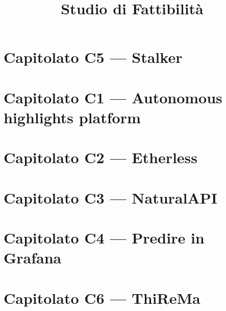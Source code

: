\documentclass{article}
\title{Studio di Fattibilità}
\begin{document}


\section{Capitolato C5 --- Stalker}%
\label{sec:c5}



\newpage
\section{Capitolato C1 --- Autonomous highlights platform}%
\label{sec:c1}



\newpage
\section{Capitolato C2 --- Etherless}%
\label{sec:c2}



\newpage
\section{Capitolato C3 --- NaturalAPI}%
\label{sec:c3}



\newpage
\section{Capitolato C4 --- Predire in Grafana}%
\label{sec:c4}



\newpage
\section{Capitolato C6 --- ThiReMa}%
\label{sec:c6}


\end{document}
